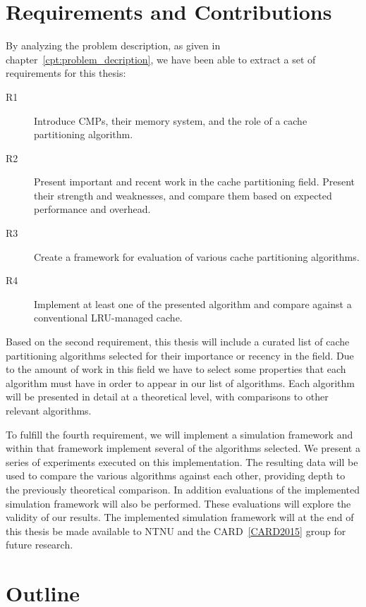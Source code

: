 \section{Requirements and Contributions}
By analyzing the problem description, as given in chapter~\ref{cpt:problem_decription}, we have been able to extract a set of requirements for this thesis:

\begin{description}
    \item[R1] Introduce CMPs, their memory system, and the role of a cache partitioning algorithm.
    \item[R2] Present important and recent work in the cache partitioning field. Present their strength and weaknesses, and compare them based on expected performance and overhead.
    \item[R3] Create a framework for evaluation of various cache partitioning algorithms.
    \item[R4] Implement at least one of the presented algorithm and compare against a conventional LRU-managed cache.
\end{description}

Based on the second requirement, this thesis will include a curated list of cache partitioning algorithms selected for their importance or recency in the field.
Due to the amount of work in this field we have to select some properties that each algorithm must have in order to appear in our list of algorithms.
Each algorithm will be presented in detail at a theoretical level, with comparisons to other relevant algorithms.

To fulfill the fourth requirement, we will implement a simulation framework and within that framework implement several of the algorithms selected.
We present a series of experiments executed on this implementation.
The resulting data will be used to compare the various algorithms against each other, providing depth to the previously theoretical comparison.
In addition evaluations of the implemented simulation framework will also be performed.
These evaluations will explore the validity of our results.
The implemented simulation framework will at the end of this thesis be made available to NTNU and the CARD~\ref{CARD2015} group for future research.

\section{Outline}

